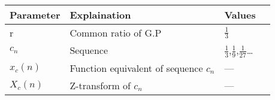 \begin{table}[ht]
    \begin{tabular}{ | >{\centering\arraybackslash}m{2cm} | >{\centering\arraybackslash}m{3cm} | >{\centering\arraybackslash}m{2cm} | @{}m{0pt}@{} }
    \hline
    \textbf{Parameter} & \textbf{Explaination} & \textbf{Values} &\\[10pt]
    \hline
    r & Common ratio of G.P & $\frac{1}{3}$ &\\[10pt]
    \hline
    $c_n$ & Sequence & $\frac{1}{3}$,$\frac{1}{9}$,$\frac{1}{27}$\dots &\\[10pt]
    \hline
    $x_c(n)$ & Function equivalent of sequence $c_n$ & --- &\\[10pt]
    \hline 
    $X_c(n)$ & Z-transform of $c_n$ & --- &\\[10pt]
    \hline 
    \end{tabular}
    \begin{center}
    \end{center}
\end{table}
